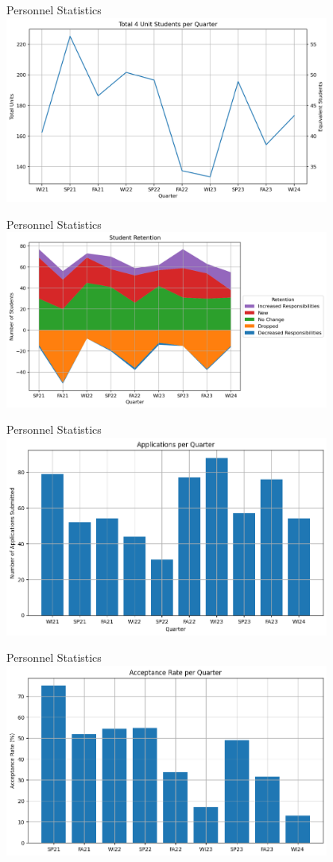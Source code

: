 \begin{frame}{Personnel Statistics}
    \centering
    \includegraphics[width=0.8\textwidth,height=0.8\textheight,keepaspectratio]{images/image (2).png}
\end{frame}
\begin{frame}{Personnel Statistics}
    \centering
    \includegraphics[width=0.8\textwidth,height=0.8\textheight,keepaspectratio]{images/image (3).png}
\end{frame}
\begin{frame}{Personnel Statistics}
    \centering
    \includegraphics[width=0.8\textwidth,height=0.8\textheight,keepaspectratio]{images/image (4).png}
\end{frame}
\begin{frame}{Personnel Statistics}
    \centering
    \includegraphics[width=0.8\textwidth,height=0.8\textheight,keepaspectratio]{images/image (5).png}
\end{frame}
